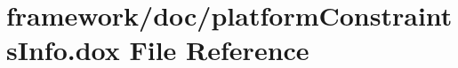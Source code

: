 \hypertarget{platform_constraints_info_8dox}{}\section{framework/doc/platform\+Constraints\+Info.dox File Reference}
\label{platform_constraints_info_8dox}

